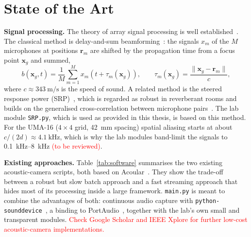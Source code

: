 \documentclass[11pt,a4paper]{article}
\newcommand{\ph}[1]{\textcolor{red}{#1}}
\newcommand{\code}[1]{\texttt{#1}}
\begin{document}
\section{State of the Art}
\textbf{Signal processing.} The theory of array signal processing is well
established~\cite{benesty2008,brandstein2001}. The classical method is
delay-and-sum beamforming~\cite{vanveen1988}: the signals $x_m$ of the $M$
microphones at positions $\mathbf{r}_m$ are shifted by the propagation time
from a focus point $\mathbf{x}_g$ and summed,
\begin{equation}
  b(\mathbf{x}_g,t) = \frac{1}{M}\sum_{m=1}^{M} x_m\!\left(t + \tau_m(\mathbf{x}_g)\right),
  \qquad
  \tau_m(\mathbf{x}_g) = \frac{\lVert \mathbf{x}_g - \mathbf{r}_m \rVert}{c},
  \label{eq:das}
\end{equation}
where $c \approx \SI{343}{\metre\per\second}$ is the speed of sound. A related
method is the steered response power (SRP)~\cite{dibiase2001}, which is
regarded as robust in reverberant rooms and builds on the generalised
cross-correlation between microphone pairs~\cite{knapp1976}. The lab module
\code{SRP.py}, which is used as provided in this thesis, is based on this
method. For the UMA-16 ($4\times4$ grid, \SI{42}{\milli\metre} spacing) spatial
aliasing starts at about $c/(2d) \approx \SI{4.1}{\kilo\hertz}$, which is why
the lab modules band-limit the signals to
\SIrange{0.1}{8}{\kilo\hertz}\ph{ (to be reviewed)}.

\textbf{Existing approaches.} Table~\ref{tab:software} summarises the two
existing acoustic-camera scripts, both based on Acoular~\cite{sarradj2017}.
They show the trade-off between a robust but slow batch approach and a fast
streaming approach that hides most of its processing inside a large framework.
\code{main.py} is meant to combine the advantages of both: continuous audio
capture with \code{python-sounddevice}~\cite{sounddevice}, a binding to
PortAudio~\cite{portaudio}, together with the lab's own small and transparent
modules. \ph{Check Google Scholar and IEEE Xplore for further
low-cost acoustic-camera implementations.}
\end{document}
